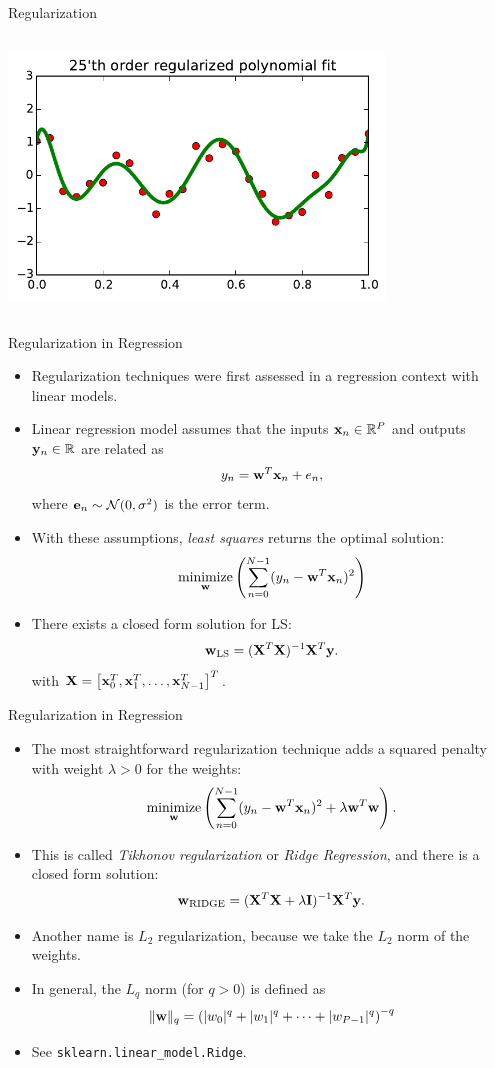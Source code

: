 \documentclass[10pt, aspectratio=169]{beamer} %
\DeclareMathOperator*{\minimize}{minimize} %
\newcommand{\e}{{\bf e}}
\newcommand{\R}{{\mathbb{R}}}
\newcommand{\w}{{\bf w}}
\newcommand{\X}{{\bf X}}
\newcommand{\x}{{\bf x}}
\newcommand{\y}{{\bf y}}
\newcommand{\leveys}{0.75\textwidth}
\begin{document}
\begin{frame}{Regularization}
\begin{columns}
\includegraphics[width=\leveys]{timeSeries_25_reg.pdf}
\end{columns}
\end{frame}

\begin{frame}[fragile]{Regularization in Regression}
\begin{itemize}
\item Regularization techniques were first assessed in a regression context with linear models.
\item Linear regression model assumes that the inputs $\x_n\in \R^{P}$ and outputs $\y_n\in \R$ 
are related as
\[
y_n = \w^T\x_n + e_n,
\]
where $\e_n\sim {\cal N}(0, \sigma^2)$ is the error term.
\item With these assumptions, \emph{least squares} returns the optimal solution:
\[
\minimize_{\w}\left( \sum_{n = 0}^{N-1} (y_n - \w^T\x_n)^2 \right)
\]
\item There exists a closed form solution for LS:
\[
\w_{\text{LS}} = (\X^T\X)^{-1}\X^T\y.
\]
with $\X = \left[\x_0^T,\x_1^T,\ldots,\x_{N-1}^T\right]^T$.
\end{itemize}
\end{frame}

\begin{frame}[fragile]{Regularization in Regression}
\begin{itemize}
\item The most straightforward regularization technique adds a squared penalty with weight $\lambda>0$ for the weights:
\[
\minimize_{\w}\left( \sum_{n = 0}^{N-1} (y_n - \w^T\x_n)^2 + \lambda\w^T\w\right).
\]
\item This is called \emph{Tikhonov regularization} or \emph{Ridge Regression}, and there is a closed form solution:
\[
\w_{\text{RIDGE}} = (\X^T\X + \lambda{\bf I})^{-1}\X^T\y.
\]
\item Another name is $L_2$ regularization, because we take the $L_2$ norm of the weights.
\item In general, the $L_q$ norm (for $q>0$) is defined as 
\[
\|\w\|_q = \left( |w_0|^q +|w_1|^q + \cdots + |w_{P-1}|^{q} \right)^{-q}
\]
\item See \verb+sklearn.linear_model.Ridge+.
\end{itemize}
\end{frame}
\end{document}
